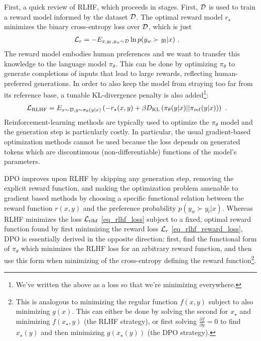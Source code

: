 First, a quick review of RLHF, which proceeds in stages. First, $ \mathcal{D} $ is used to train a reward
model informed by the dataset $ \mathcal{D} $. The optimal reward model $ r_{ \star } $ minimizes the
binary cross-entropy loss over $ \mathcal{D} $, which is just
\begin{align}
  \mathcal{L} _{ r }   &= -E _{ x, y _{ l }, y _{ w } \sim \mathcal{D} } \ln p(y _{ w } \succ y _{ l }| x ) \ . \label{eq_rlhf_reward_loss}
\end{align}
 The reward model embodies human preferences and we want to
transfer this knowledge to the language model $ \pi _{ \theta } $. This can be done by optimizing $
\pi _{ \theta  } $ to generate completions of inputs that lead to large rewards, reflecting
human-preferred generations. In order to also keep the model from straying too far from its
reference base, a tunable KL-divergence penalty is also added\footnote{We've written the above as a
loss so that we're minimizing everywhere.}:
\begin{align}
    \mathcal{L} _{ {\rm RLHF} }  &= E _{x \sim \mathcal{D}, y \sim \pi _{ \theta  }(y|x) } \left ( -r _{ \star }
    (x, y) + \beta D _{ {\rm KL} } \left ( \pi  _{ \theta  }(y|x)|| \pi _{{\rm ref}}(y|x) \right )
\right ) \ . \label{eq_rlhf_loss}
\end{align}
 Reinforcement-learning methods are typically used to optimize the $ \pi _{ \theta  } $ model and
 the generation step is particularly costly.  In particular, the usual gradient-based optimization
 methods cannot be used because the loss depends on generated tokens which are discontinuous
 (non-differentiable) functions of the model's parameters.

DPO improves upon RLHF by skipping any generation step, removing the explicit reward function, and
making the optimization problem amenable to gradient based methods by choosing a specific functional
relation between the reward function $ r(x, y) $ and the preference probability $p(y _{ w } \succ y
_{ l }| x )$. Whereas RLHF minimizes the loss $ \mathcal{L} _{ {\rm rlhf} } $ \eqref{eq_rlhf_loss} subject
to a fixed, optimal reward function found by first minimizing the reward loss $ \mathcal{L} _{ r } $
\eqref{eq_rlhf_reward_loss}, DPO is essentially derived in the opposite direction: first, find the
functional form of $ \pi _{ \theta } $ which minimizes the RLHF loss for an arbitrary reward
function, and then use this form when minimizing of the cross-entropy defining the reward
function\footnote{This is analogous to minimizing the regular function $f(x, y)$ subject to also
    minimizing $ g(x) $. This can either be done by solving the second for $ x _{ \star } $ and
    minimizing $ f(x _{ \star }, y) $ (the RLHF strategy), or first solving $ \frac{ \partial f }{
\partial y  } =0$ to find $ x _{ \star }(y) $ and then minimizing $ g(x _{ \star }(y)) $ (the DPO
strategy).}.



